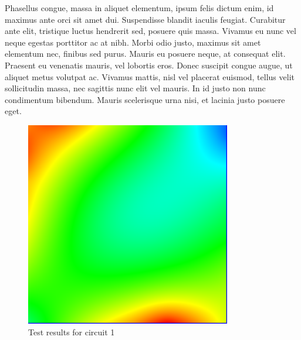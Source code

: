 \documentclass[a4paper,12pt]{article}
\begin{document}
Phasellus congue, massa in aliquet elementum, ipsum felis dictum enim, id maximus ante orci sit amet dui. Suspendisse blandit iaculis feugiat. Curabitur ante elit, tristique luctus hendrerit sed, posuere quis massa. Vivamus eu nunc vel neque egestas porttitor ac at nibh. Morbi odio justo, maximus sit amet elementum nec, finibus sed purus. Mauris eu posuere neque, at consequat elit. Praesent eu venenatis mauris, vel lobortis eros. Donec suscipit congue augue, ut aliquet metus volutpat ac. Vivamus mattis, nisl vel placerat euismod, tellus velit sollicitudin massa, nec sagittis nunc elit vel mauris. In id justo non nunc condimentum bibendum. Mauris scelerisque urna nisi, et lacinia justo posuere eget. 
\begin{figure}[ht!]
    \centering
    \includegraphics[width=0.8\textwidth]{img/eg.png} %
    \caption{Test results for circuit 1}
    \label{fig:circuit1}
\end{figure}
\end{document}
